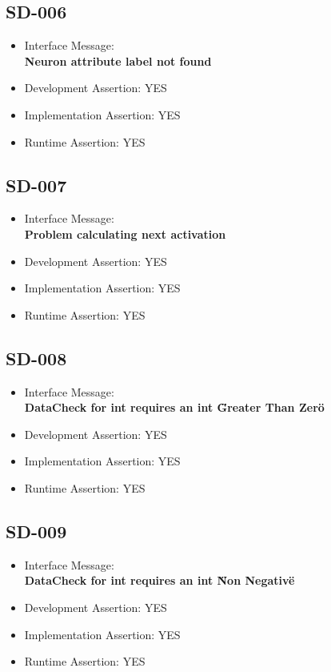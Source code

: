 \subsection{SD-006}
\begin{itemize}
  \item Interface Message:\\[1em]
    \textbf{Neuron attribute label not found}
  \item Development Assertion: YES
  \item Implementation Assertion: YES
  \item Runtime Assertion: YES
\end{itemize}

\subsection{SD-007}
\begin{itemize}
  \item Interface Message:\\[1em]
    \textbf{Problem calculating next activation}
  \item Development Assertion: YES
  \item Implementation Assertion: YES
  \item Runtime Assertion: YES
\end{itemize}

\subsection{SD-008}
\begin{itemize}
  \item Interface Message:\\[1em]
    \textbf{DataCheck for int requires an int \"Greater Than Zero\"}
  \item Development Assertion: YES
  \item Implementation Assertion: YES
  \item Runtime Assertion: YES
\end{itemize}

\subsection{SD-009}
\begin{itemize}
  \item Interface Message:\\[1em]
    \textbf{DataCheck for int requires an int \"Non Negative\"}
  \item Development Assertion: YES
  \item Implementation Assertion: YES
  \item Runtime Assertion: YES
\end{itemize}

